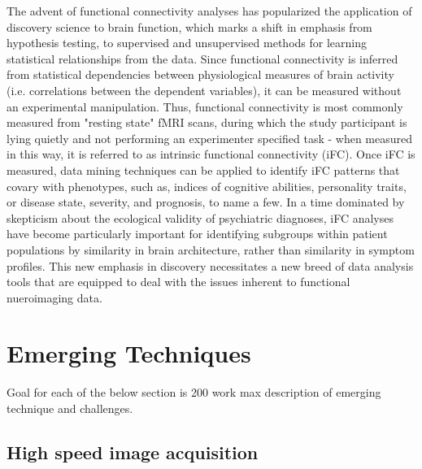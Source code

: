 The advent of functional connectivity analyses has popularized the application of discovery science to brain function, which marks a shift in emphasis from hypothesis testing, to supervised and unsupervised methods for learning statistical relationships from the data. Since functional connectivity is inferred from statistical dependencies between physiological measures of brain activity (i.e. correlations between the dependent variables), it can be measured without an experimental manipulation. Thus, functional connectivity is most commonly measured from "resting state" fMRI scans, during which the study participant is lying quietly and not performing an experimenter specified task - when measured in this way, it is referred to as intrinsic functional connectivity (iFC). Once iFC is measured, data mining techniques can be applied to identify iFC patterns that covary with phenotypes, such as, indices of cognitive abilities, personality traits, or disease state, severity, and prognosis, to name a few. In a time dominated by skepticism about the ecological validity of psychiatric diagnoses, iFC analyses have become particularly important for identifying subgroups within patient populations by similarity in brain architecture, rather than similarity in symptom profiles. This new emphasis in discovery necessitates a new breed of data analysis tools that are equipped to deal with the issues inherent to functional nueroimaging data.





\section{Emerging Techniques}

Goal for each of the below section is 200 work max description of emerging technique and challenges.

\subsection{High speed image acquisition}


